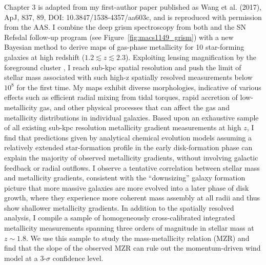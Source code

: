 Chapter 3 is adapted from my first-author paper published as Wang et al. (2017), ApJ, 837, 89, DOI:
10.3847/1538-4357/aa603c, and is reproduced with permission from the AAS.
I combine the deep \hst grism spectroscopy from both \glass and the SN Refsdal follow-up program (see
Figure~\ref{fig:macs1149_grism}) with a new Bayesian method to derive maps of gas-phase
metallicity for 10 star-forming galaxies at
high redshift ($1.2\lesssim z \lesssim2.3$). Exploiting lensing magnification by the foreground cluster \clyi, I
reach sub-kpc spatial resolution and push the limit of stellar mass associated with such high-z spatially
resolved measurements below $10^8$ \Msun for the first time. My maps exhibit diverse morphologies, indicative of
various effects such as efficient radial mixing from tidal torques, rapid accretion of low-metallicity gas, and
other physical processes that can affect the gas and metallicity distributions in individual galaxies. Based upon
an exhaustive sample of all existing sub-kpc resolution metallicity gradient measurements at high $z$, I find
that predictions given by analytical chemical evolution models assuming a relatively extended star-formation
profile in the early disk-formation phase can explain the majority of observed metallicity gradients, without
involving galactic feedback or radial outflows.  I observe a tentative correlation between stellar mass and
metallicity gradients, consistent with the ``downsizing'' galaxy formation picture that more massive galaxies are
more evolved into a later phase of disk growth, where they experience more coherent mass assembly at all radii
and thus show shallower metallicity gradients. In addition to the spatially resolved analysis, I compile a sample
of homogeneously cross-calibrated integrated metallicity measurements spanning three orders of magnitude in
stellar mass at $z\sim1.8$. We use this sample to study the mass-metallicity relation (MZR) and find that the
slope of the observed MZR can rule out the momentum-driven wind model at a 3-$\sigma$ confidence level.

